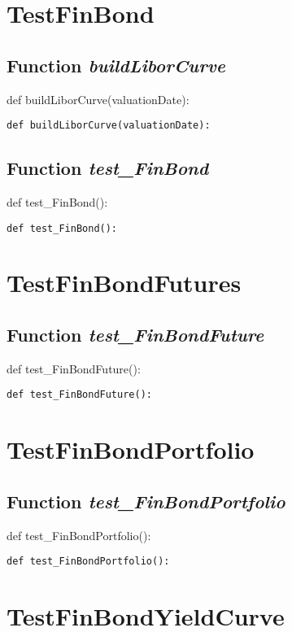 \documentclass[twoside,11pt]{book}
\begin{document}
\newpage
\section{TestFinBond}

\subsection{Function {\it buildLiborCurve}}
def buildLiborCurve(valuationDate):

\begin{lstlisting}
def buildLiborCurve(valuationDate):
\end{lstlisting}

\subsection{Function {\it test\_FinBond}}
def test\_FinBond():

\begin{lstlisting}
def test_FinBond():
\end{lstlisting}


\newpage
\section{TestFinBondFutures}

\subsection{Function {\it test\_FinBondFuture}}
def test\_FinBondFuture():

\begin{lstlisting}
def test_FinBondFuture():
\end{lstlisting}


\newpage
\section{TestFinBondPortfolio}

\subsection{Function {\it test\_FinBondPortfolio}}
def test\_FinBondPortfolio():

\begin{lstlisting}
def test_FinBondPortfolio():
\end{lstlisting}


\newpage
\section{TestFinBondYieldCurve}
\end{document}
